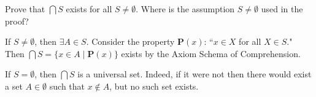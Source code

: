 \documentclass[class=report, crop=false]{standalone}
\begin{document}
  \begin{problem}
    Prove that \(\bigcap S\) exists for all \(S \neq \emptyset\). Where is the assumption \(S \neq \emptyset\) used in the proof?
  \end{problem}

  \begin{solution}
    If \(S \neq \emptyset\), then \(\exists A \in S\). Consider the property \(\textbf{P}(x)\): ``\(x \in X\) for all \(X \in S\)."
    Then \(\bigcap S = \{x \in A \mid \textbf{P}(x)\}\) exists by the Axiom Schema of Comprehension.

    If \(S = \emptyset\), then \(\bigcap S\) is a universal set. Indeed, if it were not then there would exist a set \(A \in \emptyset\) such that \(x \notin A\), but no such set exists.
  \end{solution}
\end{document}

